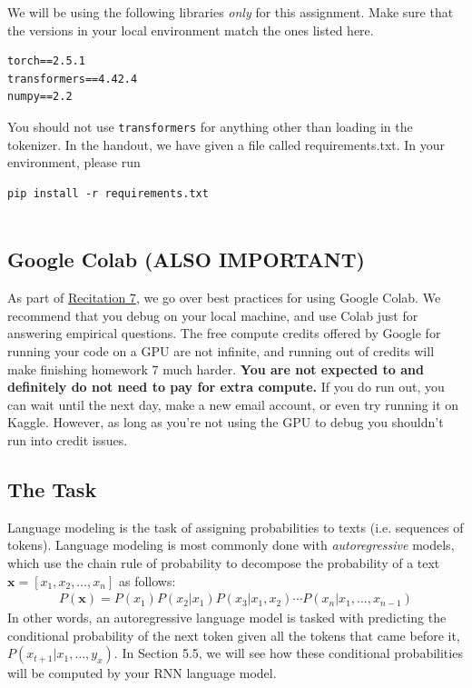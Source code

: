 \documentclass[11pt,addpoints,answers]{exam}
\newcommand{\xv}{\mathbf{x}}
\begin{document}
We will be using the following libraries \textit{only} for this assignment. Make sure that the versions in your local environment match the ones listed here.

\begin{lstlisting}
torch==2.5.1
transformers==4.42.4
numpy==2.2
\end{lstlisting}

You should not use \texttt{transformers} for anything other than loading in the tokenizer. In the handout, we have given a file called requirements.txt. In your environment, please run \begin{lstlisting}
pip install -r requirements.txt
    
\end{lstlisting}

\subsection{Google Colab (ALSO IMPORTANT)}

As part of \href{https://www.cs.cmu.edu/~mgormley/courses/10601/handout/hw7_recitation.pdf}{Recitation 7}, we go over best practices for using Google Colab. We recommend that you debug on your local machine, and use Colab just for answering empirical questions. The free compute credits offered by Google for running your code on a GPU are not infinite, and running out of credits will make finishing homework 7 much harder. \textbf{You are not expected to and definitely do not need to pay for extra compute.} If you do run out, you can wait until the next day, make a new email account, or even try running it on Kaggle. However, as long as you're not using the GPU to debug you shouldn't run into credit issues.

\subsection{The Task}\label{task}

Language modeling is the task of assigning probabilities to texts (i.e. sequences of tokens). Language modeling is most commonly done with \textit{autoregressive} models, which use the chain rule of probability to decompose the probability of a text $\xv = [ x_1, x_2, \ldots, x_n ]$ as follows:
\begin{align*}
    P(\xv) = P(x_1) P(x_2 | x_1) P(x_3 | x_1, x_2) \cdots P(x_n | x_1,\ldots,x_{n-1})
\end{align*}
In other words, an autoregressive language model is tasked with predicting the conditional probability of the next token given all the tokens that came before it, $P(x_{t+1} | x_1,\ldots,y_{x})$. In Section 5.5, we will see how these conditional probabilities will be computed by your RNN language model.
\end{document}
